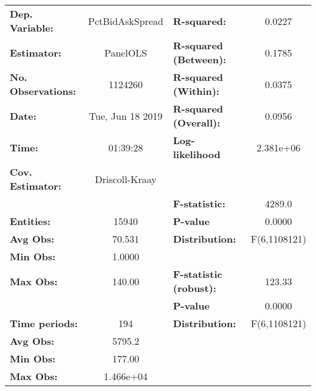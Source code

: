 \begin{center}
\begin{tabular}{lclc}
\toprule
\textbf{Dep. Variable:}                 &  PctBidAskSpread   & \textbf{  R-squared:         }   &      0.0227      \\
\textbf{Estimator:}                     &      PanelOLS      & \textbf{  R-squared (Between):}  &      0.1785      \\
\textbf{No. Observations:}              &      1124260       & \textbf{  R-squared (Within):}   &      0.0375      \\
\textbf{Date:}                          &  Tue, Jun 18 2019  & \textbf{  R-squared (Overall):}  &      0.0956      \\
\textbf{Time:}                          &      01:39:28      & \textbf{  Log-likelihood     }   &    2.381e+06     \\
\textbf{Cov. Estimator:}                &   Driscoll-Kraay   & \textbf{                     }   &                  \\
\textbf{}                               &                    & \textbf{  F-statistic:       }   &      4289.0      \\
\textbf{Entities:}                      &       15940        & \textbf{  P-value            }   &      0.0000      \\
\textbf{Avg Obs:}                       &       70.531       & \textbf{  Distribution:      }   &   F(6,1108121)   \\
\textbf{Min Obs:}                       &       1.0000       & \textbf{                     }   &                  \\
\textbf{Max Obs:}                       &       140.00       & \textbf{  F-statistic (robust):} &      123.33      \\
\textbf{}                               &                    & \textbf{  P-value            }   &      0.0000      \\
\textbf{Time periods:}                  &        194         & \textbf{  Distribution:      }   &   F(6,1108121)   \\
\textbf{Avg Obs:}                       &       5795.2       & \textbf{                     }   &                  \\
\textbf{Min Obs:}                       &       177.00       & \textbf{                     }   &                  \\
\textbf{Max Obs:}                       &     1.466e+04      & \textbf{                     }   &                  \\

\end{tabular}
\end{center}
